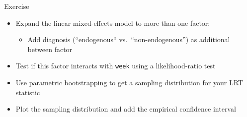 \documentclass[aspectratio=169]{beamer}
\begin{document}
\begin{frame}[fragile]{}
  \begin{block}{Exercise}
    \begin{itemize}
      \item Expand the linear mixed-effects model to more than one factor:
        \begin{itemize}
          \item Add diagnosis (``endogenous`` vs.\ ``non-endogenous'') as
            additional between factor
        \end{itemize}
      \item Test if this factor interacts with \texttt{week} using a
        likelihood-ratio test
      \item Use parametric bootstrapping to get a sampling distribution for your
        LRT statistic
      \item Plot the sampling distribution and add the empirical confidence
        interval
    \end{itemize}
  \end{block}
\end{frame}

\appendix
\end{document}
